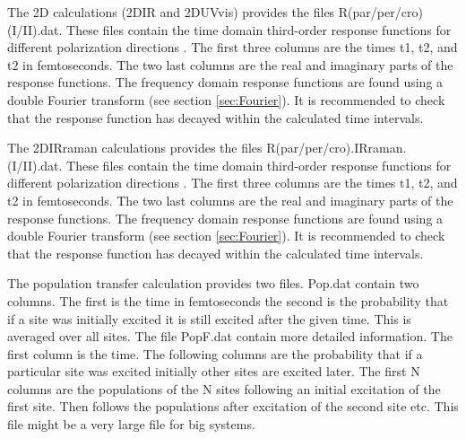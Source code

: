 
The 2D calculations (2DIR and 2DUVvis) provides the files R(par/per/cro)(I/II).dat. These files contain the time domain
third-order response functions for different polarization directions \cite{Hochstrasser.2001.CP.266.273,Zanni.2001.PNAS.98.11265}.
The first three columns are the times t1, t2, and t2 in femtoseconds.
The two last columns are the real and imaginary parts of the response functions. The frequency domain
response functions are found using a double Fourier transform (see section \ref{sec:Fourier}).
It is recommended to check that the response function has decayed within the calculated time intervals.

The 2DIRraman calculations provides the files R(par/per/cro).IRraman.(I/II).dat. These files contain the time domain
third-order response functions for different polarization directions \cite{Hochstrasser.2001.CP.266.273,Zanni.2001.PNAS.98.11265}.
The first three columns are the times t1, t2, and t2 in femtoseconds.
The two last columns are the real and imaginary parts of the response functions. The frequency domain
response functions are found using a double Fourier transform (see section \ref{sec:Fourier}).
It is recommended to check that the response function has decayed within the calculated time intervals. 


The population transfer calculation provides two files. Pop.dat contain two columns. The first is the
time in femtoseconds the second is the probability that if a site was initially excited it is still excited
after the given time. This is averaged over all sites. The file PopF.dat contain more detailed information.
The first column is the time. The following columns are the probability that if a particular site was excited
initially other sites are excited later. The first N columns are the populations of the N sites following an initial excitation of the first site. Then follows the populations after excitation of the second site etc. This file might be a very large file for big systems.

